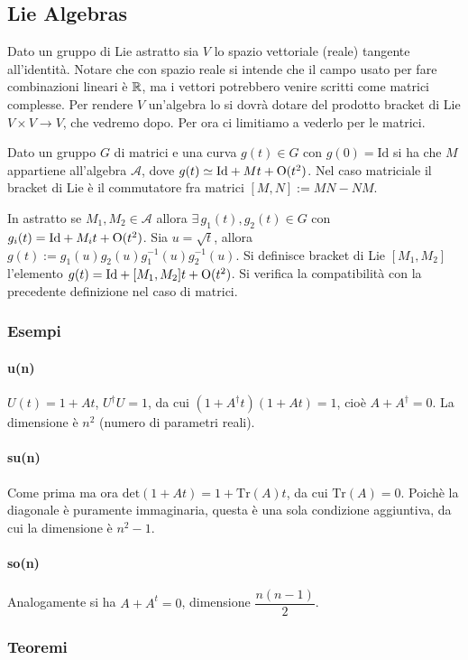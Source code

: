 \documentclass[12pt,oneside,notitlepage,abstracton,a4paper]{scrartcl}
\newcommand{\A}{\mathcal{A}}
\begin{document}
\subsection{Lie Algebras}
Dato un gruppo di Lie astratto sia $V$ lo spazio vettoriale (reale) tangente all'identità. Notare che con spazio reale si intende che il campo usato per fare combinazioni lineari è $\mathbb{R}$, ma i vettori potrebbero venire scritti come matrici complesse. Per rendere $V$ un'algebra lo si dovrà dotare del prodotto bracket di Lie $V\times V \rightarrow V$, che vedremo dopo. Per ora ci limitiamo a vederlo per le matrici.

Dato un gruppo $G$ di matrici e una curva $g(t)\in G$ con $g(0) = \mathrm{Id}$ si ha che $M$ appartiene all'algebra $\A$, dove $g(t) \simeq \mathrm{Id} + M t + \mathrm{O}(t^2)$. Nel caso matriciale il bracket di Lie è il commutatore fra matrici $[M,N] := MN-NM$.

In astratto se $M_1,M_2\in \A$ allora $\exists\, g_1(t),g_2(t)\in G$ con $g_i(t) = \mathrm{Id} + M_i t + \mathrm{O}(t^2)$. Sia $u = \sqrt{t}$, allora $g(t) := g_1(u)g_2(u)g_1^{-1}(u)g_2^{-1}(u)$. Si definisce bracket di Lie $[M_1,M_2]$ l'elemento $g(t) = \mathrm{Id} + [M_1,M_2] t + \mathrm{O}(t^2)$. Si verifica la compatibilità con la precedente definizione nel caso di matrici.

\subsubsection{Esempi}
\paragraph{u(n)} $U(t) = 1 + At$, $U^\dagger U = 1$, da cui $(1+A^\dagger t)(1+At) = 1$, cioè $A+A^\dagger = 0$. La dimensione è $n^2$ (numero di parametri reali).
\paragraph{su(n)} Come prima ma ora $\mathrm{det}(1+At)=1+\mathrm{Tr}(A)t$, da cui $\mathrm{Tr}(A) = 0$. Poichè la diagonale è puramente immaginaria, questa è una sola condizione aggiuntiva, da cui la dimensione è $n^2-1$.
\paragraph{so(n)} Analogamente si ha $A + A^t = 0$, dimensione $\dfrac{n(n-1)}{2}$.

\subsubsection{Teoremi}
\end{document}
